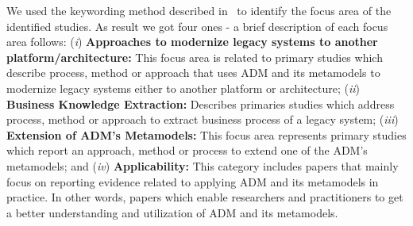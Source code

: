 We used the keywording method described in~\cite{Petersen:2008:SMS:2227115.2227123} to identify the focus area of the identified studies. As result we got four ones - a brief description of each focus area follows: (\textit{i}) \textbf{Approaches to modernize legacy systems to another platform/architecture:} This focus area is related to primary studies which describe process, method or approach that uses ADM and its metamodels to modernize legacy systems either to another platform  or architecture; (\textit{ii}) \textbf{Business Knowledge Extraction:} Describes primaries studies which address process, method or approach to extract business process of a legacy system; (\textit{iii}) \textbf{Extension of ADM's Metamodels:} This focus area represents primary studies which report an approach, method or process to extend one of the ADM's metamodels; and (\textit{iv}) \textbf{Applicability:} This category includes papers that mainly focus on reporting evidence related to applying ADM and its metamodels in practice. In other words, papers which enable researchers and practitioners to get a better understanding and utilization of ADM and its metamodels.






